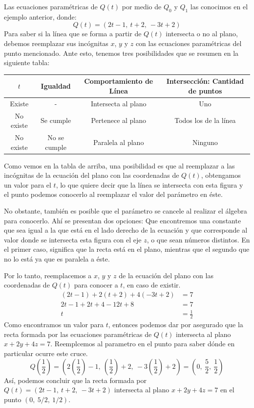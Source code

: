 \documentclass[12pt]{article}
\begin{document}
Las ecuaciones paramétricas de $Q(t)$ por medio de $Q_{0}$ y $Q_{1}$ las conocimos en el ejemplo anterior, donde:
\[
  Q(t) = (2t - 1, \ t + 2, \ -3t + 2)
\]
Para saber si la línea que se forma a partir de $Q(t)$ intersecta o no al plano, debemos reemplazar sus incógnitas $x$, $y$ y $z$ con las ecuaciones paramétricas del punto mencionado. Ante esto, tenemos tres posibilidades que se resumen en la siguiente tabla:

\begin{table}[hbt!]
\centering

\begin{tabular}{c c c c}
\hline
$t$ & Igualdad & Comportamiento de Línea & Intersección: Cantidad de puntos \\
\hline
Existe & - & Intersecta al plano & Uno \\
No existe & Se cumple & Pertenece al plano & Todos los de la línea \\
No existe & No se cumple & Paralela al plano & Ninguno \\
\hline
\end{tabular}

\end{table}

Como vemos en la tabla de arriba, una posibilidad es que al reemplazar a las incógnitas de la ecuación del plano con las coordenadas de $Q(t)$, obtengamos un valor para el $t$, lo que quiere decir que la línea se intersecta con esta figura y el punto podemos conocerlo al reemplazar el valor del parámetro en éste.

No obstante, también es posible que el parámetro se cancele al realizar el álgebra para conocerlo. Ahí se presentan dos opciones: Que encontremos una constante que sea igual a la que está en el lado derecho de la ecuación y que corresponde al valor donde se intersecta esta figura con el eje $z$, o que sean números distintos. En el primer caso, significa que la recta está en el plano, mientras que el segundo que no lo está ya que es paralela a éste.

Por lo tanto, reemplacemos a $x$, $y$ y $z$ de la ecuación del plano con las coordenadas de $Q(t)$ para conocer a $t$, en caso de existir.
\begin{align*}
  (2t - 1) + 2(t + 2) + 4(-3t + 2) &= 7 \\
         2t - 1 + 2t + 4 - 12t + 8 &= 7 \\
                                 t &= \frac{1}{2}
\end{align*}
Como encontramos un valor para $t$, entonces podemos dar por asegurado que la recta formada por las ecuaciones paramétricas de $Q(t)$ intersecta al plano $x + 2y + 4z = 7$. Reemplcemos al parametro en el punto para saber dónde en particular ocurre este cruce.
\[
  Q\left(\frac{1}{2}\right) = \left(2\left(\frac{1}{2}\right) - 1, \ \left(\frac{1}{2}\right) + 2, \ -3\left(\frac{1}{2}\right) + 2\right)
                            = \left(0, \ \frac{5}{2}, \ \frac{1}{2}\right)
\]
Así, podemos concluir que la recta formada por $Q(t) = (2t - 1, \ t + 2, \ -3t + 2)$ intersecta al plano $x + 2y + 4z = 7$ en el punto $(0, \ 5/2, \ 1/2)$.
\end{document}
